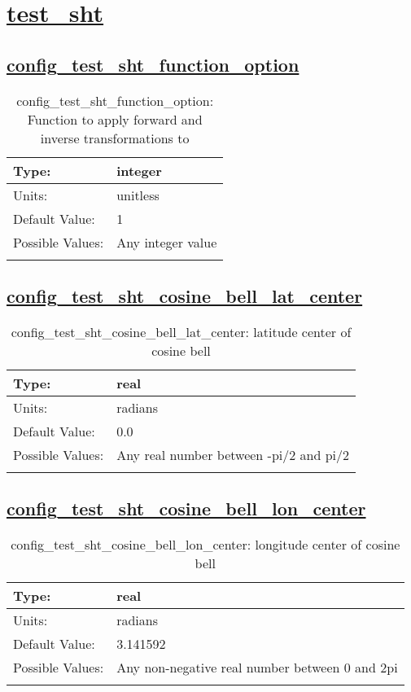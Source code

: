 \section[test\_sht]{\hyperref[sec:nm_tab_test_sht]{test\_sht}}
\label{sec:nm_sec_test_sht}
\subsection[config\_test\_sht\_function\_option]{\hyperref[sec:nm_tab_test_sht]{config\_test\_sht\_function\_option}}
\label{subsec:nm_sec_config_test_sht_function_option}
\begin{center}
\begin{longtable}{| p{2.0in} || p{4.0in} |}
    \hline
    Type: & integer \\
    \hline
    Units: & \si{unitless} \\
    \hline
    Default Value: & 1 \\
    \hline
    Possible Values: & Any integer value \\
    \hline
    \caption{config\_test\_sht\_function\_option: Function to apply forward and inverse transformations to}
\end{longtable}
\end{center}
\subsection[config\_test\_sht\_cosine\_bell\_lat\_center]{\hyperref[sec:nm_tab_test_sht]{config\_test\_sht\_cosine\_bell\_lat\_center}}
\label{subsec:nm_sec_config_test_sht_cosine_bell_lat_center}
\begin{center}
\begin{longtable}{| p{2.0in} || p{4.0in} |}
    \hline
    Type: & real \\
    \hline
    Units: & \si{radians} \\
    \hline
    Default Value: & 0.0 \\
    \hline
    Possible Values: & Any real number between -pi/2 and pi/2 \\
    \hline
    \caption{config\_test\_sht\_cosine\_bell\_lat\_center: latitude center of cosine bell}
\end{longtable}
\end{center}
\subsection[config\_test\_sht\_cosine\_bell\_lon\_center]{\hyperref[sec:nm_tab_test_sht]{config\_test\_sht\_cosine\_bell\_lon\_center}}
\label{subsec:nm_sec_config_test_sht_cosine_bell_lon_center}
\begin{center}
\begin{longtable}{| p{2.0in} || p{4.0in} |}
    \hline
    Type: & real \\
    \hline
    Units: & \si{radians} \\
    \hline
    Default Value: & 3.141592 \\
    \hline
    Possible Values: & Any non-negative real number between 0 and 2pi \\
    \hline
    \caption{config\_test\_sht\_cosine\_bell\_lon\_center: longitude center of cosine bell}
\end{longtable}
\end{center}
